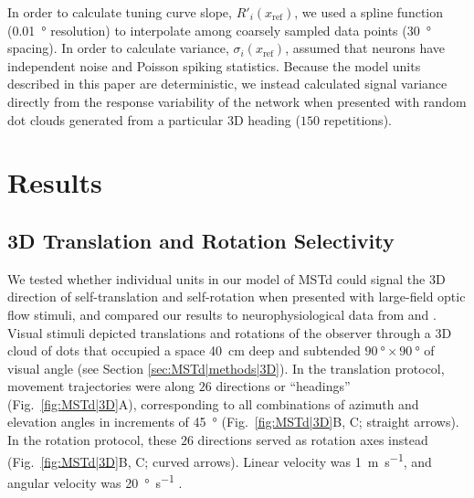 In order to calculate tuning curve slope, $R'_i(x_{\textrm{ref}})$, we used
a spline function (\SI{0.01}{\degree} resolution) to interpolate among 
coarsely sampled data points (\SI{30}{\degree} spacing). In order to calculate
variance, $\sigma_i(x_{\mathrm{ref}})$, \cite{Gu2010} assumed that neurons 
have independent noise and Poisson spiking statistics. Because the model 
units described in this paper are deterministic, we instead calculated signal
variance directly from the response variability of the network when presented
with random dot clouds generated from a particular 3D heading ($150$ 
repetitions).


\section{Results}
\subsection{3D Translation and Rotation Selectivity}
\label{sec:MSTd|results|3D}
We tested whether individual units in our model of \ac{MSTd} could signal 
the 3D direction of self-translation and self-rotation when presented with 
large-field optic flow stimuli, and compared our results to neurophysiological
data from \cite{Gu2006} and \cite{Takahashi2007}. Visual stimuli depicted
translations and rotations of the observer through a 3D cloud of dots that
occupied a space \SI{40}{\centi\meter} deep and subtended 
$\SI{90}{\degree} \times \SI{90}{\degree}$ of visual angle 
(see Section \ref{sec:MSTd|methods|3D}). In the translation protocol, 
movement trajectories were along $26$ directions or ``headings'' 
(Fig.~\ref{fig:MSTd|3D}A), corresponding to all combinations of azimuth and
elevation angles in increments of \SI{45}{\degree} (Fig.~\ref{fig:MSTd|3D}B, C;
straight arrows). In the rotation protocol, these $26$ directions served as
rotation axes instead (Fig.~\ref{fig:MSTd|3D}B, C; curved arrows).
Linear velocity was \SI{1}{\meter\per\second}, and angular velocity was
\SI{20}{\degree\per\second} \citep{Takahashi2007}.


